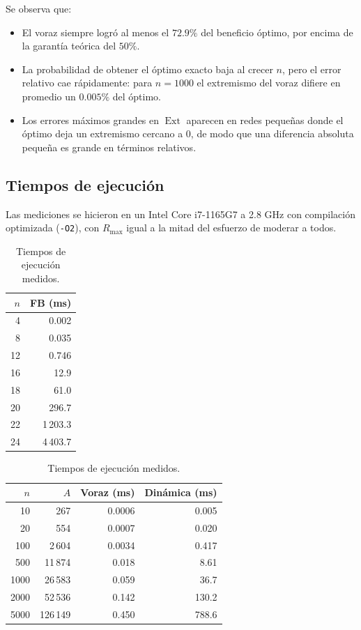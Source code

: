 \documentclass[11pt,letterpaper]{article}
\newcommand{\Ext}{\operatorname{Ext}}
\newcommand{\Rmax}{R_{\max}}
\begin{document}
Se observa que:
\begin{itemize}
  \item El voraz siempre logró al menos el $72.9\%$ del beneficio óptimo,
        por encima de la garantía teórica del $50\%$.
  \item La probabilidad de obtener el óptimo exacto baja al crecer $n$, pero
        el error relativo cae rápidamente: para $n = 1000$ el extremismo del
        voraz difiere en promedio un $0.005\%$ del óptimo.
  \item Los errores máximos grandes en $\Ext$ aparecen en redes pequeñas
        donde el óptimo deja un extremismo cercano a $0$, de modo que una
        diferencia absoluta pequeña es grande en términos relativos.
\end{itemize}

\subsection{Tiempos de ejecución}

Las mediciones se hicieron en un Intel Core i7-1165G7 a 2.8 GHz con
compilación optimizada (\texttt{-O2}), con $\Rmax$ igual a la mitad del
esfuerzo de moderar a todos.

\begin{table}[h]
\centering
\begin{minipage}{0.38\textwidth}
\centering
\begin{tabular}{rr}
\toprule
$n$ & FB (ms) \\
\midrule
4  & 0.002 \\
8  & 0.035 \\
12 & 0.746 \\
16 & 12.9 \\
18 & 61.0 \\
20 & 296.7 \\
22 & 1\,203.3 \\
24 & 4\,403.7 \\
\bottomrule
\end{tabular}
\end{minipage}%
\begin{minipage}{0.58\textwidth}
\centering
\begin{tabular}{rrrr}
\toprule
$n$ & $A$ & Voraz (ms) & Dinámica (ms) \\
\midrule
10   & 267       & 0.0006 & 0.005 \\
20   & 554       & 0.0007 & 0.020 \\
100  & 2\,604    & 0.0034 & 0.417 \\
500  & 11\,874   & 0.018  & 8.61 \\
1000 & 26\,583   & 0.059  & 36.7 \\
2000 & 52\,536   & 0.142  & 130.2 \\
5000 & 126\,149  & 0.450  & 788.6 \\
\bottomrule
\end{tabular}
\end{minipage}
\caption{Tiempos de ejecución medidos.}
\label{tab:tiempos}
\end{table}
\end{document}
